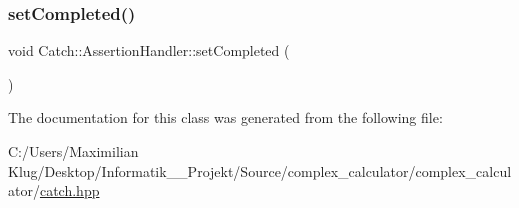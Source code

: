 \subsubsection{\texorpdfstring{set\+Completed()}{setCompleted()}}
{\footnotesize\ttfamily void Catch\+::\+Assertion\+Handler\+::set\+Completed (\begin{DoxyParamCaption}{ }\end{DoxyParamCaption})}



The documentation for this class was generated from the following file\+:\begin{DoxyCompactItemize}
\item 
C\+:/\+Users/\+Maximilian Klug/\+Desktop/\+Informatik\+\_\+\_\+\+Projekt/\+Source/complex\+\_\+calculator/complex\+\_\+calculator/\mbox{\hyperlink{catch_8hpp}{catch.\+hpp}}\end{DoxyCompactItemize}
